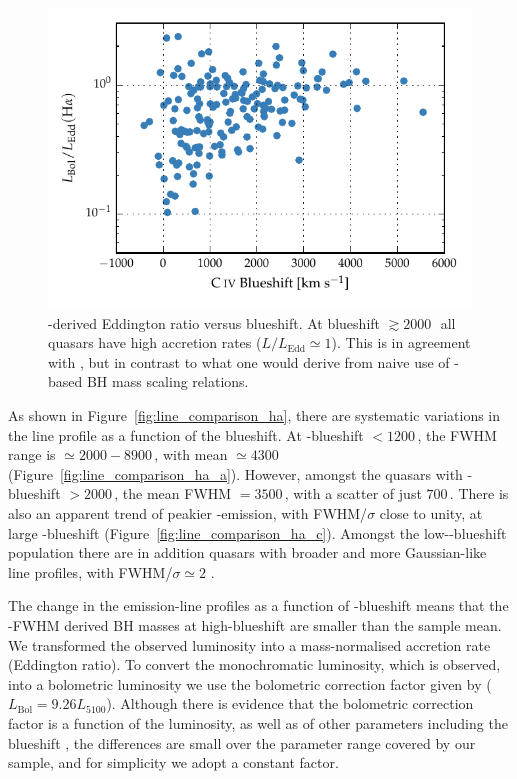 \begin{figure}
    \centering
    \includegraphics[width=0.8\linewidth]{figures/chapter03/ha_edd_civ_bs.pdf}
    \caption[{\hans-derived Eddington ratio versus  blueshift.}]{\hans-derived Eddington ratio versus  blueshift. At blueshift $\gtrsim2000$\,\kms\, all quasars have high accretion rates ($L/L_{\text{Edd}} \simeq 1$). This is in agreement with \citet{kratzer15}, but in contrast to what one would derive from naive use of -based BH mass scaling relations.}
    \label{fig:ha_edd_civ_bs}
\end{figure}

As shown in Figure~\ref{fig:line_comparison_ha}, there are systematic variations in the \ha line profile as a function of the  blueshift. 
At -blueshift $<1200$\,\kms, the \ha FWHM range is $\simeq2000 - 8900$\,\kms, with mean $\simeq4300$\,\kms\, (Figure~\ref{fig:line_comparison_ha_a}). 
However, amongst the quasars with -blueshift $>2000$\,\kms, the mean \ha FWHM $=3500$\,\kms, with a scatter of just $700$\,\kms. 
There is also an apparent trend of peakier \hans-emission, with FWHM/$\sigma$ close to unity, at large -blueshift (Figure~\ref{fig:line_comparison_ha_c}). 
Amongst the low--blueshift population there are in addition quasars with broader and more Gaussian-like \ha line profiles, with FWHM/$\sigma \simeq 2$ . 

The change in the \ha emission-line profiles as a function of -blueshift means that the \hans-FWHM derived BH masses at high-blueshift are smaller than the sample mean. 
We transformed the observed luminosity into a mass-normalised accretion rate (Eddington ratio).
To convert the monochromatic luminosity, which is observed, into a bolometric luminosity we use the bolometric correction factor given by \citet{richards06} ($L_{\text{Bol}} = 9.26L_{5100}$).
Although there is evidence that the bolometric correction factor is a function of the luminosity, as well as of other parameters including the  blueshift \citep{krawczyk13}, the differences are small over the parameter range covered by our sample, and for simplicity we adopt a constant factor. 

